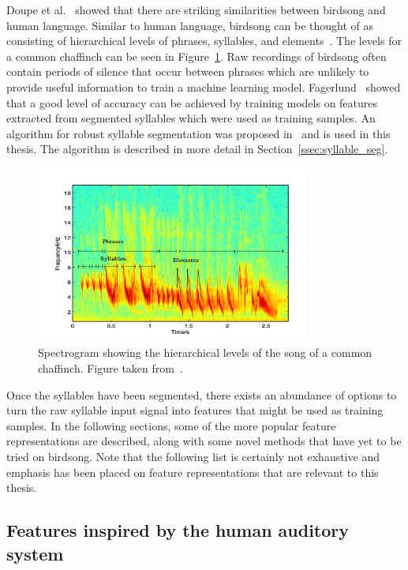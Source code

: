 Doupe et al.~\cite{birdsongspeech} showed that there are striking similarities
between birdsong and human language. Similar to human language, birdsong can be
thought of as consisting of hierarchical levels of phrases, syllables, and
elements~\cite{catchpole2003bird}. The levels for a common chaffinch can be seen
in Figure~\ref{fig:syllables}. Raw recordings of birdsong
often contain periods of silence that occur between phrases which are unlikely
to provide useful information to train a machine learning model.
Fagerlund~\cite{fagerlund2007bird} showed that a good level of accuracy can be
achieved by training models on features extracted from segmented syllables which
were used as training samples. An algorithm for robust syllable segmentation was
proposed in~\cite{fagerlund2004automatic} and is used in this thesis. The
algorithm is described in more detail in Section~\ref{ssec:syllable_seg}.

\begin{figure}[ht]
  \centering
  \includegraphics[width=0.8\textwidth]{figures/syllables.png}
  \caption{Spectrogram showing the hierarchical levels of the song of a common
  chaffinch. Figure taken from~\cite{fagerlund2004automatic}.}\label{fig:syllables}
\end{figure}

Once the syllables have been segmented, there exists an abundance of options to
turn the raw syllable input signal into features that might be used as training
samples. In the following sections, some of the more popular feature
representations are described, along with some novel methods that have yet to be
tried on birdsong. Note that the following list is certainly not exhaustive and
emphasis has been placed on feature representations that are relevant to this
thesis.

\subsection{Features inspired by the human auditory system}

